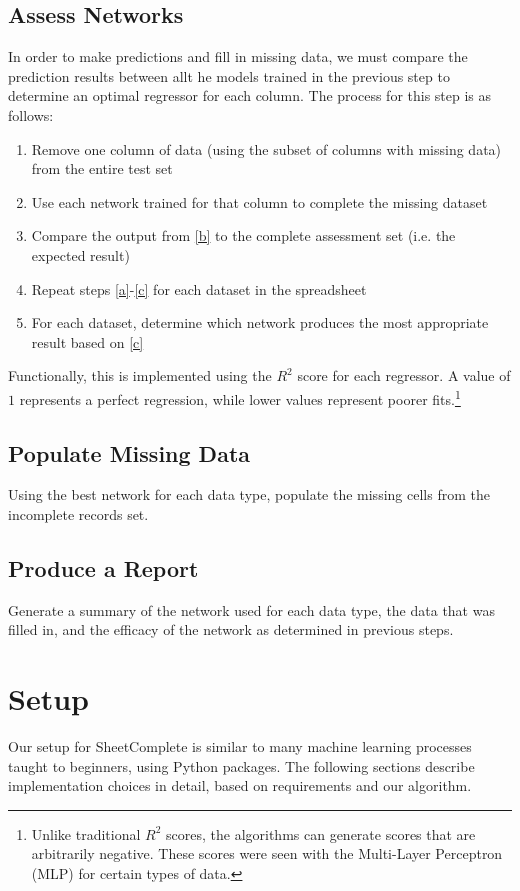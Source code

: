 \documentclass[conference]{IEEEtran}
\begin{document}
\subsection{Assess Networks}
In order to make predictions and fill in missing data, we must compare the prediction results between allt he models trained in the previous step to determine an optimal regressor for each column. The process for this step is as follows:
\begin{enumerate}[label=(\alph*)]
\item Remove one column of data (using the subset of columns with missing data) from the entire test set \label{a}
\item Use each network trained for that column to complete the missing dataset \label{b}
\item Compare the output from \ref{b} to the complete assessment set (i.e. the expected result) \label{c}
\item Repeat steps \ref{a}-\ref{c} for each dataset in the spreadsheet
\item For each dataset, determine which network produces the most appropriate result based on \ref{c}
\end{enumerate}

Functionally, this is implemented using the $R^2$ score for each regressor. A value of $1$ represents a perfect regression, while lower values represent poorer fits.\footnote{Unlike traditional $R^2$ scores, the algorithms can generate scores that are arbitrarily negative. These scores were seen with the Multi-Layer Perceptron (MLP) for certain types of data.}

\subsection{Populate Missing Data}
Using the best network for each data type, populate the missing cells from the incomplete records set.

\subsection{Produce a Report}
Generate a summary of the network used for each data type, the data that was filled in, and the efficacy of the network as determined in previous steps.

\section{Setup}
Our setup for SheetComplete is similar to many machine learning processes taught to beginners, using Python packages. The following sections describe implementation choices in detail, based on requirements and our algorithm.
\end{document}

